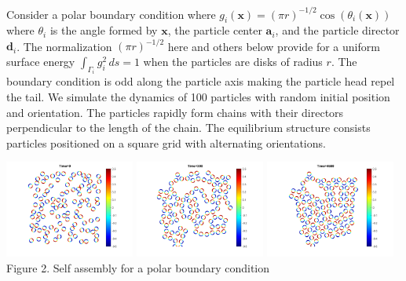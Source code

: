 Consider a polar boundary condition where
$g_i(\mathbf{x}) = (\pi r)^{-1/2} \cos (\theta_i(\mathbf{x}))$
where $\theta_i$ is the angle formed by $\mathbf{x}$, the particle
center $\mathbf{a}_i$, and the particle director $\mathbf{d}_i$.
The normalization $(\pi r)^{-1/2}$ here and others below
provide for a uniform surface energy $\int_{\Gamma_i} g_i^2 \,ds = 1$
when the particles are disks of radius $r$.
The boundary condition is odd along the particle axis 
making the particle head repel the tail.
We simulate the dynamics of 100 particles with random initial position
and orientation. The particles rapidly form chains with their
directors perpendicular to the length of the chain. The equilibrium
structure consists particles positioned on a square grid with alternating
orientations.
\begin{center}
    \includegraphics[width=0.32\textwidth]{figures/SpecificAim1/N100_A1.png}
    \includegraphics[width=0.32\textwidth]{figures/SpecificAim1/N100_A2.png}
    \includegraphics[width=0.32\textwidth]{figures/SpecificAim1/N100_A5.png}\\
    Figure 2. Self assembly for a polar boundary condition
    \label{fig:self-assemblyA}
\end{center}


